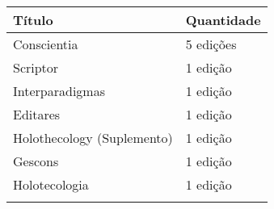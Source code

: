 \documentclass{gescons}
\begin{document}
\begin{longtable}[]{@{}
  >{\raggedright\arraybackslash}p{}
  >{\raggedright\arraybackslash}p{}@{}}
\toprule\noalign{}
\begin{minipage}[b]{\linewidth}\centering
\textbf{Título}
\end{minipage} & \begin{minipage}[b]{\linewidth}\centering
\textbf{Quantidade}
\end{minipage} \\
\hline
\begin{minipage}[b]{\linewidth}\raggedright
Conscientia
\end{minipage} & \begin{minipage}[b]{\linewidth}\raggedright
5 edições
\end{minipage} \\
\hline
\begin{minipage}[b]{\linewidth}\raggedright
Scriptor
\end{minipage} & \begin{minipage}[b]{\linewidth}\raggedright
1 edição
\end{minipage} \\
\hline
\begin{minipage}[b]{\linewidth}\raggedright
Interparadigmas
\end{minipage} & \begin{minipage}[b]{\linewidth}\raggedright
1 edição
\end{minipage} \\
\hline
\begin{minipage}[b]{\linewidth}\raggedright
Editares
\end{minipage} & \begin{minipage}[b]{\linewidth}\raggedright
1 edição
\end{minipage} \\
\hline
\begin{minipage}[b]{\linewidth}\raggedright
Holothecology (Suplemento)
\end{minipage} & \begin{minipage}[b]{\linewidth}\raggedright
1 edição
\end{minipage} \\
\hline
\begin{minipage}[b]{\linewidth}\raggedright
Gescons
\end{minipage} & \begin{minipage}[b]{\linewidth}\raggedright
1 edição
\end{minipage} \\
\hline
\begin{minipage}[b]{\linewidth}\raggedright
Holotecologia
\end{minipage} & \begin{minipage}[b]{\linewidth}\raggedright
1 edição
\end{minipage} \\
\midrule\noalign{}
\endhead
\bottomrule\noalign{}
\endlastfoot
\end{longtable}


\end{document}
